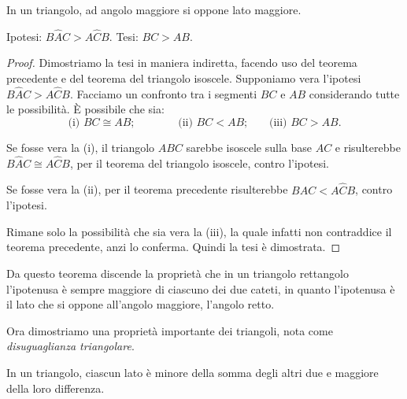 \begin{teorema}
In un triangolo, ad angolo maggiore si oppone lato maggiore.
\end{teorema}

\noindent Ipotesi: $B\widehat{A}C>A\widehat{C}B$. Tesi: $BC>AB$.

\begin{proof}
Dimostriamo la tesi in maniera indiretta, facendo uso del teorema precedente e del teorema del triangolo isoscele. Supponiamo vera l'ipotesi $B\widehat{A}C>A\widehat{C}B$. Facciamo un confronto tra i segmenti $BC$ e $AB$ considerando tutte le possibilità. \`E possibile che sia:
\[\text{(i) }BC\cong AB\text{;}\qquad\qquad \text{(ii) }BC<AB\text{;}\quad\quad\text{(iii) }BC>AB\text{.}\]

Se fosse vera la (i), il triangolo $ABC$ sarebbe isoscele sulla base $AC$ e risulterebbe $B\widehat{A}C\cong A\widehat{C}B$, per il teorema del triangolo isoscele, contro l'ipotesi.

Se fosse vera la (ii), per il teorema precedente risulterebbe $B\widehat{A}C<A\widehat{C}B$, contro l'ipotesi.

Rimane solo la possibilità che sia vera la (iii), la quale infatti non contraddice il teorema precedente, anzi lo conferma. Quindi la tesi è dimostrata.
\end{proof}

Da questo teorema discende la proprietà che in un triangolo rettangolo l'ipotenusa è sempre maggiore di ciascuno dei due cateti, in quanto l'ipotenusa è il lato che si oppone all'angolo maggiore, l'angolo retto.

Ora dimostriamo una proprietà importante dei triangoli, nota come \emph{disuguaglianza triangolare}.

\begin{teorema}
In un triangolo, ciascun lato è minore della somma degli altri due e maggiore della loro differenza.
\end{teorema}

